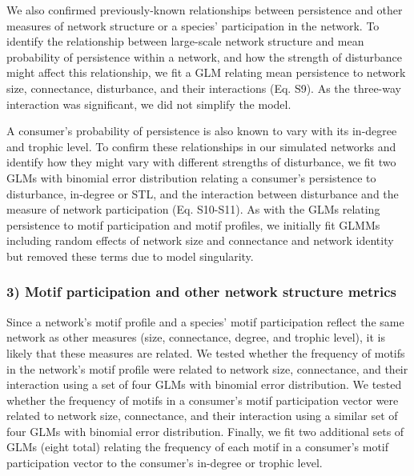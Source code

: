 \documentclass[12pt]{article}
\begin{document}
\begin{spacing}{2.0}
            We also confirmed previously-known relationships between persistence and other measures of network structure or a species' participation in the network.
            To identify the relationship between large-scale network structure and mean probability of persistence within a network, and how the strength of disturbance might affect this relationship, we fit a GLM relating mean persistence to network size, connectance, disturbance, and their interactions (Eq. S9).
            As the three-way interaction was significant, we did not simplify the model. 
            

            A consumer's probability of persistence is also known to vary with its in-degree and trophic level.
            To confirm these relationships in our simulated networks and identify how they might vary with different strengths of disturbance, we fit two GLMs with binomial error distribution relating a consumer's persistence to disturbance, in-degree or STL, and the interaction between disturbance and the measure of network participation (Eq. S10-S11).
            As with the GLMs relating persistence to motif participation and motif profiles, we initially fit GLMMs including random effects of network size and connectance and network identity but removed these terms due to model singularity.



        \subsubsection*{3) Motif participation and other network structure metrics}

            Since a network's motif profile and a species' motif participation reflect the same network as other measures (size, connectance, degree, and trophic level), it is likely that these measures are related. 
            We tested whether the frequency of motifs in the network's motif profile were related to network size, connectance, and their interaction using a set of four GLMs with binomial error distribution.
            We tested whether the frequency of motifs in a consumer's motif participation vector were related to network size, connectance, and their interaction using a similar set of four GLMs with binomial error distribution.
            Finally, we fit two additional sets of GLMs (eight total) relating the frequency of each motif in a consumer's motif participation vector to the consumer's in-degree or trophic level.
        

\end{spacing}
\end{document}
